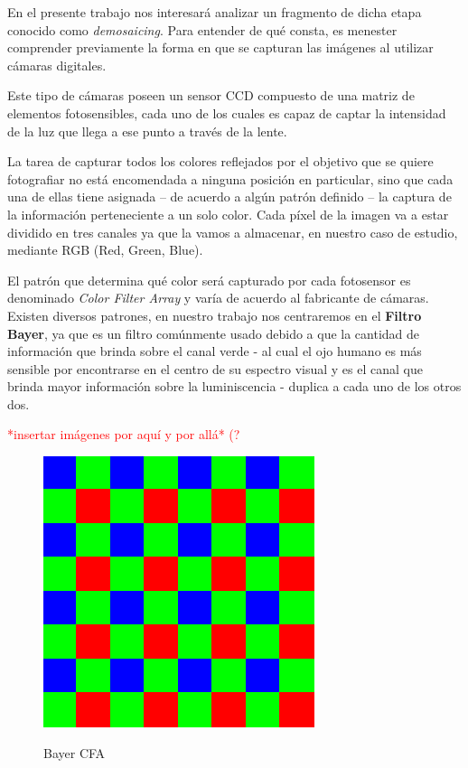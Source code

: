 \documentclass[a4paper]{article}
\begin{document}
En el presente trabajo nos interesará analizar un fragmento de dicha etapa conocido como \emph{demosaicing}. Para entender de qué consta, es menester comprender previamente la forma en que se capturan las imágenes al utilizar cámaras digitales.

Este tipo de cámaras poseen un sensor CCD compuesto de una matriz de elementos fotosensibles, cada uno de los cuales es capaz de captar la intensidad de la luz que llega a ese punto a través de la lente. 

La tarea de capturar todos los colores reflejados por el objetivo que se quiere fotografiar no está encomendada a ninguna posición en particular, sino que cada una de ellas tiene asignada – de acuerdo a algún patrón definido  – la captura de la información perteneciente a un solo color. Cada p\'ixel de la imagen va a estar dividido en tres canales ya que la vamos a almacenar, en nuestro caso de estudio, mediante RGB (Red, Green, Blue).

El patr\'on que determina qué color será capturado por cada fotosensor es denominado \emph{Color Filter Array} y var\'ia de acuerdo al fabricante de c\'amaras. Existen diversos patrones, en nuestro trabajo nos centraremos en el \textbf{Filtro Bayer}, ya que es un filtro com\'unmente usado debido a que la cantidad de informaci\'on que brinda sobre el canal verde - al cual el ojo humano es más sensible por encontrarse en el centro de su espectro visual y es el canal que brinda mayor informaci\'on sobre la luminiscencia -  duplica a cada uno de los otros dos.

\textcolor{red}{*insertar imágenes por aquí y por allá* (?
}

\begin{figure}[h!]
	\caption{Bayer CFA}
	\begin{center}
	\includegraphics[scale=0.36]{imagenes/BayerFilter}
	\label{Bayer}
  \end{center}
\end{figure}
\end{document}
